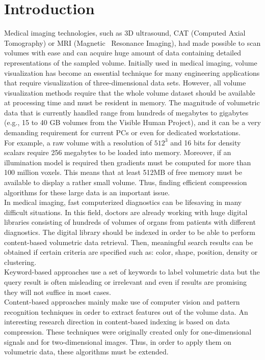 \documentclass[10pt, conference, compsocconf]{IEEEtran}
\begin{document}
\section{Introduction}
Medical imaging technologies, such as 3D ultrasound, CAT (Computed Axial Tomography) or MRI (Magnetic \ Resonance Imaging), had made possible to scan volumes with ease and can acquire huge amount of data containing detailed representations of the sampled volume. Initially used in medical imaging, volume visualization has become an essential technique for many engineering applications that require visualization of three-dimensional data sets. However, all volume visualization methods require that the whole volume dataset should be available at processing time and must be resident in memory. The magnitude of volumetric data that is currently handled range from hundreds of megabytes to gigabytes (e.g., 15 to 40 GB volumes from the Visible Human Project\textsuperscript{\textregistered}\cite{VHP}), and it can be a very demanding requirement for current PCs or even for dedicated workstations.~\\

For example, a raw volume with a resolution of $512^{3}$ and 16 bits for density scalars require 256 megabytes to be loaded into memory. Moreover, if an illumination model is required then gradients must be computed for more than 100 million voxels. This means that at least 512MB of free memory must be available to display a rather small volume. Thus, finding efficient compression algorithms for these large data is an important issue.~\\

In medical imaging, fast computerized diagnostics can be lifesaving in many difficult situations. In this field, doctors are already working with huge digital libraries consisting of hundreds of volumes of organs from patients with different diagnostics. The digital library should be indexed in order to be able to perform content-based volumetric data retrieval. Then, meaningful search results can be obtained if certain criteria are specified such as: color, shape, position, density or clustering.~\\

Keyword-based approaches use a set of keywords to label volumetric data but the query result is often misleading or irrelevant and even if results are promising they will not suffice in most cases.~\\

Content-based approaches mainly make use of computer vision and pattern recognition techniques in order to extract features out of the volume data. An interesting research direction in content-based indexing is based on data compression. 
These techniques were originally created only for one-dimensional signals and for two-dimensional images. Thus, in order to apply them on volumetric data, these algorithms must be extended.~\\
\end{document}

